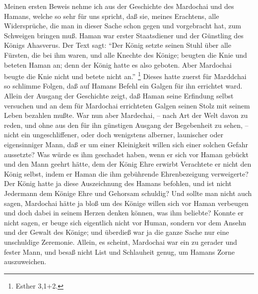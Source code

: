 Meinen ersten Beweis nehme ich aus der Geschichte des
Mardochai und des Hamans,
welche so sehr für uns spricht, daß sie, meines Erachtens, alle Widersprüche,
die man in dieser Sache schon gegen und vorgebracht hat, zum Schweigen bringen
muß. Haman war erster Staatsdiener und der Günstling des Königs Ahasverus. Der
Text sagt:
"`Der König setzte seinen Stuhl über alle Fürsten, die bei ihm waren,
und alle Knechte des Könige; beugten die Knie und beteten Haman an; denn der
König hatte es also geboten. Aber Mardochai beugte die Knie nicht und betete
nicht an."'
\footnote{Esther 3,1+2.}
Dieses hatte zuerst für Marddchai so
schlimme Folgen, daß auf Hamans Befehl ein Galgen für ihn errichtet ward. Allein
der Ausgang der Geschichte zeigt, daß Haman seine Erfindung selbst versuchen
und an dem für Mardochai errichteten Galgen seinen Stolz mit seinem Leben
bezahlen mußte. War nun aber Mardechai, -- nach Art der Welt davon zu reden, und
ohne aus den für ihn günstigen Ausgang der Begebenheit zu sehen, -- nicht ein
ungeschliffener, oder doch wenigstens alberner, launischer oder eigensinniger
Mann, daß er um einer Kleinigkeit willen sich einer solchen Gefahr aussetzte?
Was würde es ihm geschadet haben, wenn er sich vor
Haman gebückt und den Mann geehrt hätte, dem der König Ehre erwirbt Verachtete
er nicht den König selbst, indem er Haman die ihm gebührende Ehrenbezeigung
verweigerte? Der König hatte ja diese Auszeichnung des Hamans befohlen, und ist
nicht Jedermann dem Könige Ehre und Gehorsam schuldig? Und sollte man nicht auch
sagen, Mardochai hätte ja bloß um des Könige willen sich vor Haman verbeugen und
doch dabei in seinem Herzen denken können, was ihm beliebte? Konnte er nicht
sagen, er beuge sich eigentlich nicht vor Human, sondern vor dem Ansehn und der
Gewalt des Könige; und überdieß war ja die ganze Sache nur eine unschuldige
Zeremonie. Allein, es scheint, Mardochai war ein zu gerader und fester Mann, und
besaß nicht List und Schlauheit genug, um Hamans Zorne auszuweichen.

